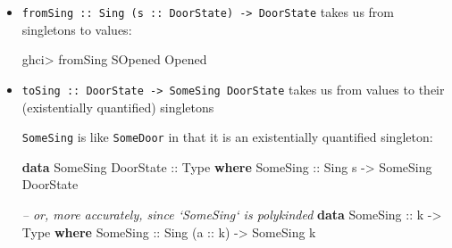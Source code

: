 \documentclass[]{article}
\newenvironment{Shaded}{}{}
\newcommand{\KeywordTok}[1]{\textcolor[rgb]{0.00,0.44,0.13}{\textbf{#1}}}
\newcommand{\DataTypeTok}[1]{\textcolor[rgb]{0.56,0.13,0.00}{#1}}
\newcommand{\StringTok}[1]{\textcolor[rgb]{0.25,0.44,0.63}{#1}}
\newcommand{\CommentTok}[1]{\textcolor[rgb]{0.38,0.63,0.69}{\textit{#1}}}
\newcommand{\OtherTok}[1]{\textcolor[rgb]{0.00,0.44,0.13}{#1}}
\newcommand{\FunctionTok}[1]{\textcolor[rgb]{0.02,0.16,0.49}{#1}}
\newcommand{\NormalTok}[1]{#1}
\begin{document}
\begin{itemize}
\item
  \texttt{fromSing\ ::\ Sing\ (s\ ::\ DoorState)\ -\textgreater{}\ DoorState}
  takes us from singletons to values:

\begin{Shaded}
\begin{Highlighting}[]
\NormalTok{ghci}\FunctionTok{>}\NormalTok{ fromSing }\DataTypeTok{SOpened}
\DataTypeTok{Opened}
\end{Highlighting}
\end{Shaded}
\item
  \texttt{toSing\ ::\ DoorState\ -\textgreater{}\ SomeSing\ DoorState} takes us
  from values to their (existentially quantified) singletons

\begin{Shaded}
\end{Shaded}

  \texttt{SomeSing} is like \texttt{SomeDoor} in that it is an existentially
  quantified singleton:

\begin{Shaded}
\begin{Highlighting}[]
\KeywordTok{data} \DataTypeTok{SomeSing} \DataTypeTok{DoorState}\OtherTok{ ::} \DataTypeTok{Type} \KeywordTok{where}
    \DataTypeTok{SomeSing}\OtherTok{ ::} \DataTypeTok{Sing}\NormalTok{ s }\OtherTok{->} \DataTypeTok{SomeSing} \DataTypeTok{DoorState}

\CommentTok{-- or, more accurately, since `SomeSing` is polykinded}
\KeywordTok{data} \DataTypeTok{SomeSing}\OtherTok{ ::}\NormalTok{ k }\OtherTok{->} \DataTypeTok{Type} \KeywordTok{where}
    \DataTypeTok{SomeSing}\OtherTok{ ::} \DataTypeTok{Sing}\NormalTok{ (}\OtherTok{a ::}\NormalTok{ k) }\OtherTok{->} \DataTypeTok{SomeSing}\NormalTok{ k}
\end{Highlighting}
\end{Shaded}
\end{itemize}
\end{document}

